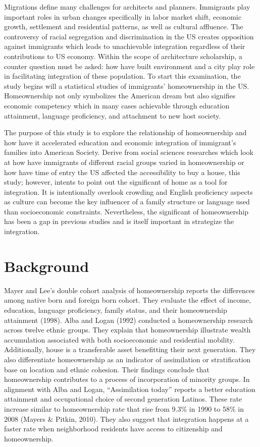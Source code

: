 \documentclass[11pt,]{article}
\begin{document}
Migrations define many challenges for architects and planners.
Immigrants play important roles in urban changes specifically in labor
market shift, economic growth, settlement and residential patterns, as
well as cultural affluence. The controversy of racial segregation and
discrimination in the US creates opposition against immigrants which
leads to unachievable integration regardless of their contributions to
US economy. Within the scope of architecture scholarship, a counter
question must be asked: how have built environment and a city play role
in facilitating integration of these population. To start this
examination, the study begins will a statistical studies of immigrants'
homeownership in the US. Homeownership not only symbolizes the American
dream but also signifies economic competency which in many cases
achievable through education attainment, language proficiency, and
attachment to new host society.

The purpose of this study is to explore the relationship of
homeownership and how have it accelerated education and economic
integration of immigrant's families into American Society. Derive from
social sciences researches which look at how have immigrants of
different racial groups varied in homeownership or how have time of
entry the US affected the accessibility to buy a house, this study;
however, intents to point out the significant of home as a tool for
integration. It is intentionally overlook crowding and English
proficiency aspects as culture can become the key influencer of a family
structure or language used than socioeconomic constraints. Nevertheless,
the significant of homeownership has been a gap in previous studies and
is itself important in strategize the integration.

\hypertarget{background}{%
\section{Background}\label{background}}

Mayer and Lee's double cohort analysis of homeownership reports the
differences among native born and foreign born cohort. They evaluate the
effect of income, education, language proficiency, family status, and
their homeownership attainment (1998). Alba and Logan (1992) conducted a
homeownership research across twelve ethnic groups. They explain that
homeownership illustrate wealth accumulation associated with both
socioeconomic and residential mobility. Additionally, house is a
transferable asset benefitting their next generation. They also
differentiate homeownership as an indicator of assimilation or
stratification base on location and ethnic cohesion. Their findings
conclude that homeownership contributes to a process of incorporation of
minority groups. In alignment with Alba and Logan, ``Assimilation
today'' reports a better education attainment and occupational choice of
second generation Latinos. These rate increase similar to homeownership
rate that rise from 9.3\% in 1990 to 58\% in 2008 (Mayers \& Pitkin,
2010). They also suggest that integration happens at a faster rate when
neighborhood residents have access to citizenship and homeownership.
\end{document}
